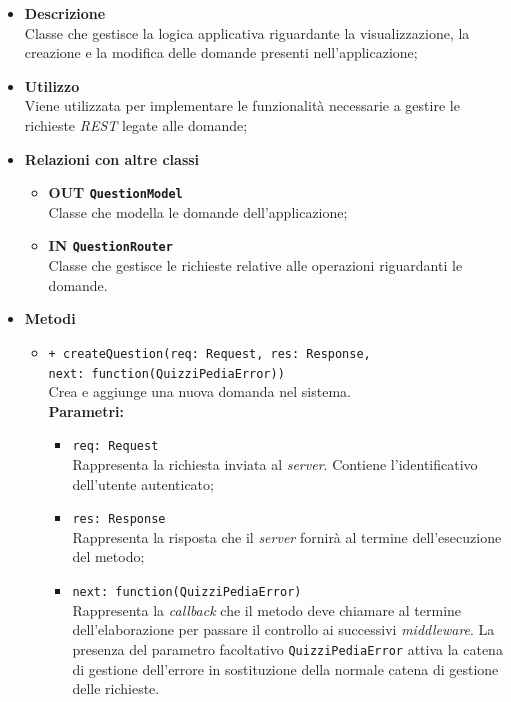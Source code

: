 	\begin{itemize}
		\item \textbf{Descrizione} \\
		Classe che gestisce la logica applicativa riguardante la visualizzazione, la creazione e la modifica delle domande presenti nell'applicazione;
		\item \textbf{Utilizzo} \\
		Viene utilizzata per implementare le funzionalità necessarie a gestire le richieste \textit{REST} legate alle domande;
		\item \textbf{Relazioni con altre classi}
			\begin{itemize}
				\item \textbf{OUT \texttt{QuestionModel}} \\
				Classe che modella le domande dell'applicazione;
				\item \textbf{IN \texttt{QuestionRouter}} \\
				Classe che gestisce le richieste relative alle operazioni riguardanti le domande.
			\end{itemize}
		\item \textbf{Metodi}
			\begin{itemize}
				\item \texttt{+ createQuestion(req: Request, res: Response,\\ next: function(QuizziPediaError))} \\
				Crea e aggiunge una nuova domanda nel sistema. \\
				\textbf{Parametri:}
				\begin{itemize}
					\item \texttt{req: Request} \\
					Rappresenta la richiesta inviata al \textit{server}. Contiene l'identificativo dell'utente autenticato;
					\item \texttt{res: Response} \\
					Rappresenta la risposta che il \textit{server} fornirà al termine dell'esecuzione del metodo;
					\item \texttt{next: function(QuizziPediaError)} \\
					Rappresenta la \textit{callback} che il metodo deve chiamare al termine dell'elaborazione per passare il controllo ai successivi \textit{middleware}. La presenza del parametro facoltativo \texttt{QuizziPediaError} attiva la catena di gestione dell'errore in sostituzione della normale catena di gestione delle richieste.
				\end{itemize}
				

\end{itemize}
\end{itemize}
